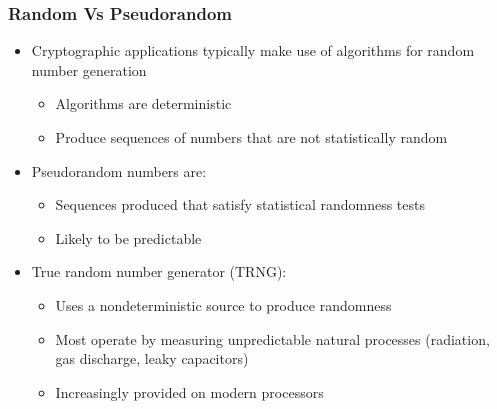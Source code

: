 \documentclass{article}
\begin{document}
                            \subsubsection{Random Vs Pseudorandom}
                            \begin{itemize}
                                \item Cryptographic applications typically make use of algorithms for random number generation
                                \begin{itemize}
                                    \item Algorithms are deterministic
                                    \item Produce sequences of numbers that are not statistically random
                                \end{itemize}
                                \item Pseudorandom numbers are:
                                \begin{itemize}
                                    \item Sequences produced that satisfy statistical randomness tests
                                    \item Likely to be predictable
                                \end{itemize}
                                \item True random number generator (TRNG):
                                \begin{itemize}
                                    \item Uses a nondeterministic source to produce randomness
                                    \item Most operate by measuring unpredictable natural processes (radiation, gas discharge, leaky capacitors)
                                    \item Increasingly provided on modern processors
                                \end{itemize}
                            \end{itemize}
\end{document}
